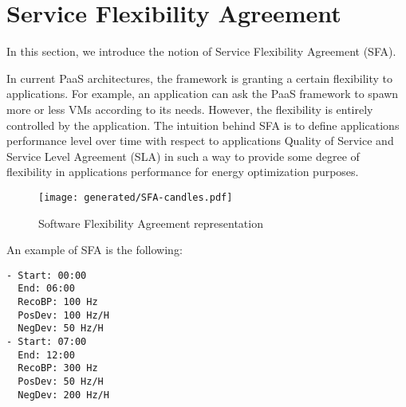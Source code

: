 \section{Service Flexibility Agreement}
In this section, we introduce the notion of Service Flexibility Agreement (SFA). 

In current PaaS architectures, the framework is granting a certain flexibility to applications.
For example, an application can ask the PaaS framework to spawn more or less VMs according to its needs.
However, the flexibility is entirely controlled by the application.
The intuition behind SFA is to define applications performance level over time with respect to applications Quality of Service and Service Level Agreement (SLA) in such a way to provide some degree of flexibility in applications performance for energy optimization purposes. 






 

\begin{figure}[h]
\centering
\texttt{[image: generated/SFA-candles.pdf]}
\caption{Software Flexibility Agreement representation}
\label{fig:EASC}
\end{figure}

An example of SFA is the following:
\begin{lstlisting}[caption={SFA example}, label={lst:SFA}]
- Start: 00:00
  End: 06:00
  RecoBP: 100 Hz
  PosDev: 100 Hz/H
  NegDev: 50 Hz/H
- Start: 07:00
  End: 12:00
  RecoBP: 300 Hz
  PosDev: 50 Hz/H
  NegDev: 200 Hz/H
\end{lstlisting}

